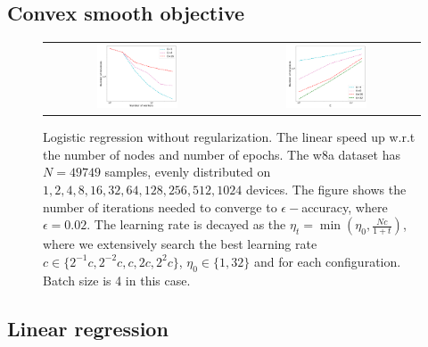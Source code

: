 \subsection{Convex smooth objective}

\begin{figure}[h!]
\centering
\begin{tabular}{cc}
	\includegraphics[width=0.45\textwidth]{fig/paper-cvxsmoothspeedupNodesT-min-w8a-epsilon013-b4-reg0.pdf} & 
\includegraphics[width=0.45\textwidth]{fig/paper-cvxsmoothspeedupEpochsT-min-w8a-epsilon013-b4-reg0.pdf} \\
\end{tabular}
	\caption{Logistic regression without regularization. The linear speed up w.r.t the number of nodes and number of epochs. The w8a dataset has $N=49749$ samples, evenly distributed on $1, 2, 4, 8, 16, 32, 64, 128, 256, 512, 1024$ devices. The figure shows the number of iterations needed to converge to $\epsilon-$accuracy, where $\epsilon=0.02$. The learning rate is decayed as the $\eta_t = \min(\eta_0, \frac{Nc}{1 + t})$, where we extensively search the best learning rate $c \in \{2^{-1}c, 2^{-2}c, c, 2c, 2^{2}c\}$, $\eta_0 \in \{1, 32\}$ and for each configuration. Batch size is 4 in this case.}
\end{figure}




\subsection{Linear regression}





